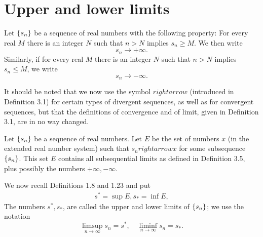 \section{Upper and lower limits}

\begin{myDef}
    \label{myDef:3.15}
    Let $\protect\{s_n\}$ be a sequence of real numbers with the following property: For every real $M$ there is an integer $N$ such that $n > N$ implies $s_n \geq M$. We then write
    \begin{equation*}
        s_n \rightarrow +\infty.
    \end{equation*}
    Similarly, if for every real $M$ there is an integer $N$ such that $n > N$ implies $s_n \leq M$, we write
    \begin{equation*}
        s_n \rightarrow -\infty.
    \end{equation*}
\end{myDef}

It should be noted that we now use the symbol $rightarrow$ (introduced in Definition 3.1) for certain types of divergent sequences, as well as for convergent sequences, but that the definitions of convergence and of limit, given in Definition 3.1, are in no way changed.

\begin{myDef}
    \label{myDef:3.16}
    Let $\protect\{s_n\}$ be a sequence of real numbers. Let $E$ be the set of numbers $x$ (in the extended real number system) such that $s_n rightarrow x$ for some subsequence $\protect\{s_n\}$. This set $E$ contains all subsequential limits as defined in Definition 3.5, plus possibly the numbers $+\infty, -\infty$.

    We now recall Definitions 1.8 and 1.23 and put
    \begin{align*}
        s^{*} = \sup E,
        s_{*} = \inf E,
    \end{align*}
    The numbers $s^{*}, s_{*}$, are called the upper and lower limits of $\protect\{s_n\}$; we use the notation 
    \begin{equation*}
        \limsup_{n \rightarrow \infty} s_n = s^{*},\quad \liminf_{n \rightarrow \infty} s_n = s_{*}.        
    \end{equation*}
\end{myDef}